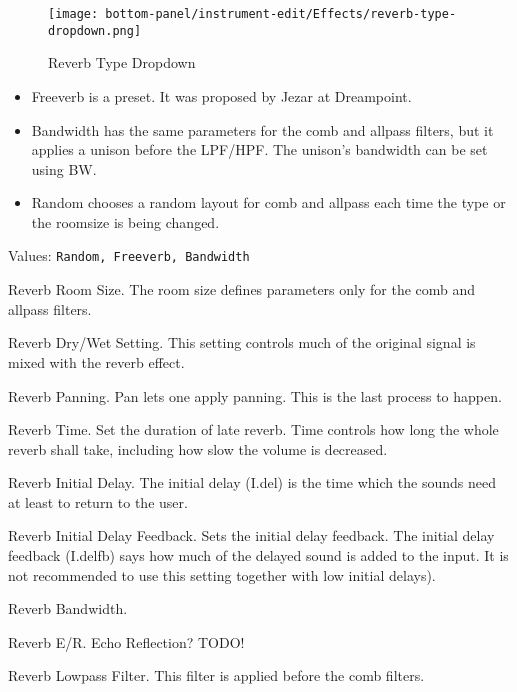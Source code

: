 \begin{figure}[H]
   \centering 
   \texttt{[image: bottom-panel/instrument-edit/Effects/reverb-type-dropdown.png]}
   \caption{Reverb Type Dropdown}
   \label{fig:reverb_type_dropdown}
\end{figure}

   \begin{itemize}
      \item Freeverb is a preset. It was proposed by Jezar at Dreampoint.
      \item Bandwidth has the same parameters for the comb and allpass
         filters, but it applies a unison before the LPF/HPF. The unison’s
         bandwidth can be set using BW.
      \item Random chooses a random layout for comb and allpass each time the
         type or the roomsize is being changed.
   \end{itemize}

   Values: \texttt{Random, Freeverb, Bandwidth}

   Reverb Room Size.
   The room size defines parameters only for the comb and allpass filters.

   Reverb Dry/Wet Setting.
   This setting controls much of the original signal is mixed with the
   reverb effect.

   Reverb Panning.
   Pan lets one apply panning. This is the last process to happen.

   Reverb Time.
   Set the duration of late reverb.
   Time controls how long the whole reverb shall take, including how slow
   the volume is decreased.

   Reverb Initial Delay.
   The initial delay (I.del) is the time which the sounds need at least to
   return to the user.

   Reverb Initial Delay Feedback.
   Sets the initial delay feedback.
   The initial delay feedback (I.delfb) says how much
   of the delayed sound is added to the input.
   It is not recommended to use this setting together with
   low initial delays).

   Reverb Bandwidth.

   Reverb E/R.
   Echo Reflection?  TODO!

   Reverb Lowpass Filter.
   This filter is applied before the comb filters.


